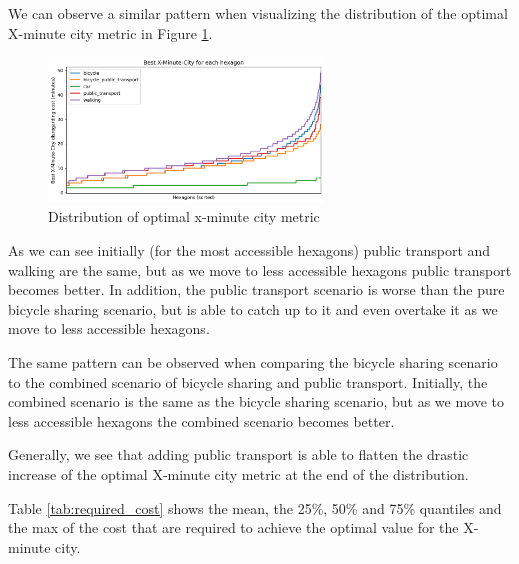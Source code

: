 We can observe a similar pattern when visualizing the distribution of the optimal X-minute city metric in Figure \ref{fig:optimal_x_minute_city_metric}.

\begin{figure}
  \begin{center}
    \includegraphics[width=0.65\textwidth]{Figures/results/best_x_minute_city}
  \end{center}
  \caption{Distribution of optimal x-minute city metric}\label{fig:optimal_x_minute_city_metric}
\end{figure}


As we can see initially (for the most accessible hexagons) public transport and walking are the same, but as we move to less accessible hexagons public transport becomes better.
In addition, the public transport scenario is worse than the pure bicycle sharing scenario, but is able to catch up to it and even overtake it as we move to less accessible hexagons.

The same pattern can be observed when comparing the bicycle sharing scenario to the combined scenario of bicycle sharing and public transport.
Initially, the combined scenario is the same as the bicycle sharing scenario, but as we move to less accessible hexagons the combined scenario becomes better.

Generally, we see that adding public transport is able to flatten the drastic increase of the optimal X-minute city metric at the end of the distribution.

Table \ref{tab:required_cost} shows the mean, the 25\%, 50\% and 75\% quantiles and the max of the cost that are required to achieve the optimal value for the X-minute city.

